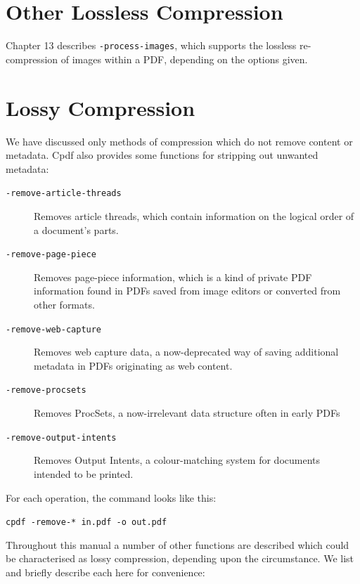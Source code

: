 \documentclass{book}
\begin{document}
\section{Other Lossless Compression}

Chapter 13 describes \texttt{-process-images}, which supports the lossless re-compression of images within a PDF, depending on the options given.

\section{Lossy Compression}

We have discussed only methods of compression which do not remove content or metadata. Cpdf also provides some functions for stripping out unwanted metadata:

\begin{description}
\item[\normalfont\texttt{-remove-article-threads}] Removes article threads, which contain information on the logical order of a document's parts.
\item[\normalfont\texttt{-remove-page-piece}] Removes page-piece information, which is a kind of private PDF information found in PDFs saved from image editors or converted from other formats.
\item[\normalfont\texttt{-remove-web-capture}] Removes web capture data, a now-deprecated way of saving additional metadata in PDFs originating as web content.
\item[\normalfont\texttt{-remove-procsets}] Removes ProcSets, a now-irrelevant data structure often in early PDFs
\item[\normalfont\texttt{-remove-output-intents}] Removes Output Intents, a colour-matching system for documents intended to be printed.
\end{description}

\noindent For each operation, the command looks like this:

  \begin{framed}
    \noindent\small\verb!cpdf -remove-* in.pdf -o out.pdf!
  \end{framed}

\noindent Throughout this manual a number of other functions are described which could be characterised as lossy compression, depending upon the circumstance. We list and briefly describe each here for convenience:
\end{document}
